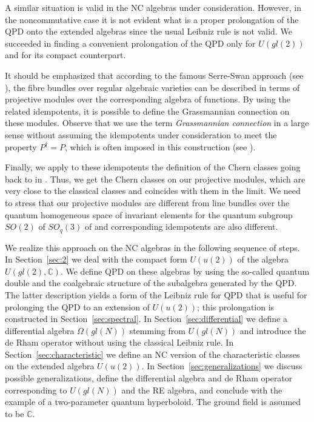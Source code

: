 \documentclass[10pt,a4paper]{amsart}
\newcommand{\C}{\mathbb{C}}
\newcommand{\Om}{\Omega}
\numberwithin{equation}{section}
\begin{document}
A similar situation is valid in the NC algebras under consideration. However, in the noncommutative case it is not evident what is a
proper prolongation of the QPD onto the extended algebras since the usual Leibniz rule is not valid. We succeeded in finding a
convenient prolongation of the QPD only for $U(gl(2))$ and for its compact counterpart.

It should be emphasized that according to the famous Serre-Swan approach (see \cite{Se, Sw}), the fibre bundles over 
regular algebraic varieties can be described in terms of projective modules over the corresponding algebra of functions. By using the related
idempotents, it is possible to define the Grassmannian connection on these modules. Observe that we use the term {\em Grassmannian connection} in a large sense without assuming the idempotents under consideration  to meet the property $P^\dag=P$, which is often imposed in this construction (see \cite{La}).

Finally, we apply to these idempotents the definition of the Chern classes going back to in \cite{Gom}. Thus, we get the Chern classes on our projective modules, which are very close to the classical classes and coincides with them in the limit. We need to stress that our projective modules are different from  line bundles over the quantum homogeneous space of invariant elements for the quantum subgroup $SO(2)$ of $SO_q(3)$ of \cite{LaPa} and corresponding idempotents are also different.

We realize this approach on the NC algebras in the following sequence of steps. In Section~\ref{sec:2} we deal with the compact
form $U(u(2))$ of the algebra $U(gl(2), \C)$. We define QPD on these algebras by using the so-called quantum double and
the coalgebraic structure of the subalgebra generated by the QPD. The latter description yields a form of the Leibniz rule for
QPD that is useful for prolonging the QPD to an extension of $U(u(2))$; this prolongation is constructed in
Section~\ref{sec:spectral}. In Section~\ref{sec:differential} we define a differential algebra $\Om(gl(N))$ stemming from
$U(gl(N))$ and introduce the de Rham operator without using the classical Leibniz rule. In Section~\ref{sec:characteristic} we define
an NC version of the characteristic classes on the extended algebra $U(u(2))$. In Section~\ref{sec:generalizations} we discuss
possible generalizations, define the differential algebra and de Rham operator corresponding to $U(gl(N))$ and the RE algebra,
and conclude with the example of a two-parameter quantum hyperboloid.
The ground field is assumed to be $\C$.
\end{document}

